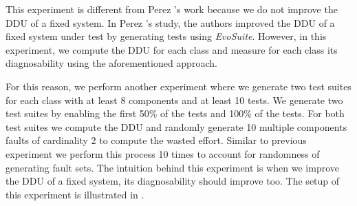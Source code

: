\documentclass[twoside,a4paper,11pt]{memoir}
\begin{document}
This experiment is different from Perez \etal's work because we do not improve the DDU of a fixed system.
In Perez \etal's study, the authors improved the DDU of a fixed system under test by generating tests using \emph{EvoSuite}.
However, in this experiment, we compute the DDU for each class and measure for each class its diagnosability using the aforementioned approach.

For this reason, we perform another experiment where we generate two test suites for each class with at least 8 components and at least 10 tests.
We generate two test suites by enabling the first 50\% of the tests and 100\% of the tests.
For both test suites we compute the DDU and randomly generate 10 multiple components faults of cardinality 2 to compute the wasted effort.
Similar to previous experiment we perform this process 10 times to account for randomness of generating fault sets.
The intuition behind this experiment is when we improve the DDU of a fixed system, its diagnosability should improve too.
The setup of this experiment is illustrated in .
\end{document}
